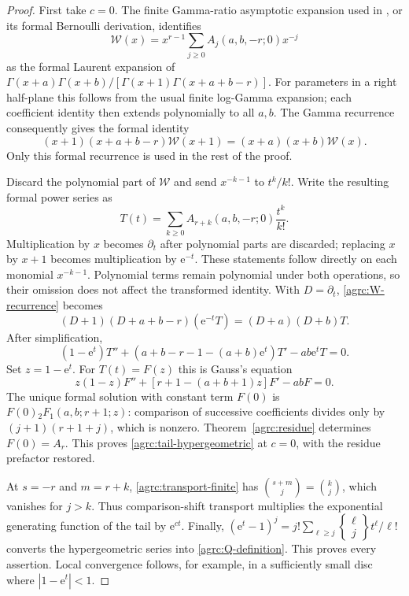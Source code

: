 \documentclass[11pt]{article}
\numberwithin{equation}{section}
\theoremstyle{definition}\newtheorem{definition}[theorem]{Definition}
\theoremstyle{remark}\newtheorem{remark}[theorem]{Remark}
\newcommand{\e}{\mathrm e}
\newcommand{\stirling}[2]{\left\{\begin{matrix}#1\\#2\end{matrix}\right\}}
\begin{document}
\begin{proof}
First take $c=0$. The finite Gamma-ratio asymptotic expansion used in
\cite{repo-gauss}, or its formal Bernoulli derivation, identifies
\begin{equation}\label{agrc:formalW}
 \mathscr W(x)=x^{r-1}\sum_{j\geq0}A_j(a,b,-r;0)x^{-j}
\end{equation}
as the formal Laurent expansion of
$\Gamma(x+a)\Gamma(x+b)/[\Gamma(x+1)\Gamma(x+a+b-r)]$.
For parameters in a right half-plane this follows from the usual finite
log-Gamma expansion; each coefficient identity then extends polynomially
to all $a,b$. The Gamma recurrence consequently gives the formal identity
\begin{equation}\label{agrc:W-recurrence}
 (x+1)(x+a+b-r)\mathscr W(x+1)
       =(x+a)(x+b)\mathscr W(x).
\end{equation}
Only this formal recurrence is used in the rest of the proof.

Discard the polynomial part of $\mathscr W$ and send
$x^{-k-1}$ to $t^k/k!$. Write the resulting formal power series as
\begin{equation}\label{agrc:T-borel}
 T(t)=\sum_{k\geq0}A_{r+k}(a,b,-r;0)\frac{t^k}{k!}.
\end{equation}
Multiplication by $x$ becomes $\partial_t$ after polynomial parts are
discarded; replacing $x$ by $x+1$ becomes multiplication by $\e^{-t}$.
These statements follow directly on each monomial $x^{-k-1}$.
Polynomial terms remain polynomial under both operations, so their
omission does not affect the transformed identity. With $D=\partial_t$,
\eqref{agrc:W-recurrence} becomes
\[
 (D+1)(D+a+b-r)(\e^{-t}T)=(D+a)(D+b)T.
\]
After simplification,
\begin{equation}\label{agrc:T-ODE}
 (1-\e^t)T''+
       (a+b-r-1-(a+b)\e^t)T'-ab\e^tT=0.
\end{equation}
Set $z=1-\e^t$. For $T(t)=F(z)$ this is Gauss's equation
\begin{equation}\label{agrc:Gauss-ODE}
 z(1-z)F''+[r+1-(a+b+1)z]F'-abF=0.
\end{equation}
The unique formal solution with constant term $F(0)$ is
$F(0){}_2F_1(a,b;r+1;z)$: comparison of successive coefficients divides
only by $(j+1)(r+1+j)$, which is nonzero. Theorem~\ref{agrc:residue}
determines $F(0)=A_r$. This proves \eqref{agrc:tail-hypergeometric}
at $c=0$, with the residue prefactor restored.

At $s=-r$ and $m=r+k$, \eqref{agrc:transport-finite} has
$\binom{s+m}{j}=\binom{k}{j}$, which vanishes for $j>k$.
Thus comparison-shift transport multiplies the exponential generating
function of the tail by $\e^{ct}$.
Finally,
$(\e^t-1)^j=j!\sum_{\ell\geq j}\stirling{\ell}{j}t^\ell/\ell!$
converts the hypergeometric series into \eqref{agrc:Q-definition}.
This proves every assertion. Local convergence follows, for example,
in a sufficiently small disc where $|1-\e^t|<1$.
\end{proof}
\end{document}
